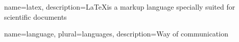 

 
{
    name=latex,
    description={\LaTeX is a markup language specially suited 
    for scientific documents}
}

{
    name=language,
    plural={languages},
    description={Way of communication}
}


